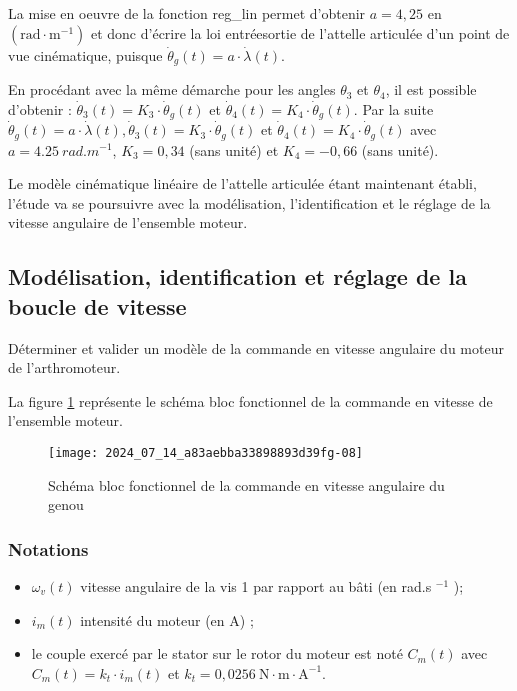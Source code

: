 
La mise en oeuvre de la fonction reg\_lin permet d'obtenir $a=4,25$ en $\left(\mathrm{rad} \cdot \mathrm{m}^{-1}\right)$ et donc d'écrire la loi entréesortie de l'attelle articulée d'un point de vue cinématique, puisque $\dot{\theta}_{g}(t)=a \cdot \dot{\lambda}(t)$.

En procédant avec la même démarche pour les angles $\theta_{3}$ et $\theta_{4}$, il est possible d'obtenir : $\dot{\theta}_{3}(t)=K_{3} \cdot \dot{\theta}_{g}(t)$ et $\dot{\theta}_{4}(t)=K_{4} \cdot \dot{\theta}_{g}(t)$. Par la suite $\dot{\theta}_{g}(t)=a \cdot \dot{\lambda}(t), \dot{\theta}_{3}(t)=K_{3} \cdot \dot{\theta}_{g}(t)$ et $\dot{\theta}_{4}(t)=K_{4} \cdot \dot{\theta}_{g}(t)$ avec $a=\SI{4,25}{rad.m^{-1}}$, $K_{3}=0,34$ (sans unité) et $K_{4}=-0,66$ (sans unité).

Le modèle cinématique linéaire de l'attelle articulée étant maintenant établi, l'étude va se poursuivre avec la modélisation, l'identification et le réglage de la vitesse angulaire de l'ensemble moteur.

\subsection{Modélisation, identification et réglage de la boucle de vitesse}
\begin{obj}
Déterminer et valider un modèle de la commande en vitesse angulaire du moteur de l'arthromoteur.
\end{obj}

La figure \ref{fig:ccs_mp_2024:fig:12} représente le schéma bloc fonctionnel de la commande en vitesse de l'ensemble moteur.

\begin{figure}[!h]\centering
\texttt{[image: 2024\_07\_14\_a83aebba33898893d39fg-08]}
\caption{\label{fig:ccs_mp_2024:fig:12}Schéma bloc fonctionnel de la commande en vitesse angulaire du genou}
\end{figure}
\subsubsection*{Notations}
\begin{itemize}
  \item $\omega_{v}(t)$ vitesse angulaire de la vis 1 par rapport au bâti (en rad.s ${ }^{-1}$ );

  \item $i_{m}(t)$ intensité du moteur (en A) ;

  \item le couple exercé par le stator sur le rotor du moteur est noté $C_{m}(t)$ avec $C_{m}(t)=k_{t} \cdot i_{m}(t)$ et $k_{t}=0,0256 \mathrm{~N} \cdot \mathrm{m} \cdot \mathrm{A}^{-1}$.

\end{itemize}

